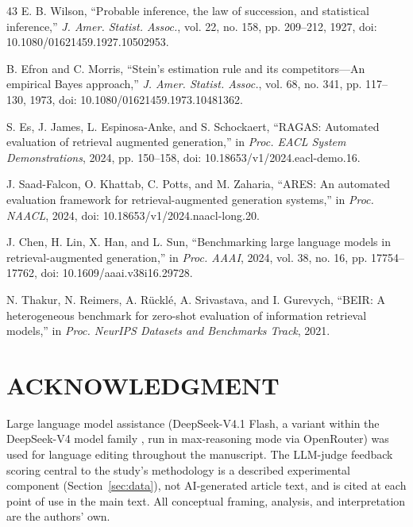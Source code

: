 \documentclass{ieeeaccess}
\begin{document}
\begin{thebibliography}{43}
 E. B. Wilson, ``Probable inference, the law of succession, and statistical inference,'' \emph{J. Amer. Statist. Assoc.}, vol. 22, no. 158, pp. 209--212, 1927, doi: 10.1080/01621459.1927.10502953.

 B. Efron and C. Morris, ``Stein's estimation rule and its competitors---An empirical Bayes approach,'' \emph{J. Amer. Statist. Assoc.}, vol. 68, no. 341, pp. 117--130, 1973, doi: 10.1080/01621459.1973.10481362.

 S. Es, J. James, L. Espinosa-Anke, and S. Schockaert, ``RAGAS: Automated evaluation of retrieval augmented generation,'' in \emph{Proc. EACL System Demonstrations}, 2024, pp. 150--158, doi: 10.18653/v1/2024.eacl-demo.16.

 J. Saad-Falcon, O. Khattab, C. Potts, and M. Zaharia, ``ARES: An automated evaluation framework for retrieval-augmented generation systems,'' in \emph{Proc. NAACL}, 2024, doi: 10.18653/v1/2024.naacl-long.20.

 J. Chen, H. Lin, X. Han, and L. Sun, ``Benchmarking large language models in retrieval-augmented generation,'' in \emph{Proc. AAAI}, 2024, vol. 38, no. 16, pp. 17754--17762, doi: 10.1609/aaai.v38i16.29728.

 N. Thakur, N. Reimers, A. R\"uckl\'e, A. Srivastava, and I. Gurevych, ``BEIR: A heterogeneous benchmark for zero-shot evaluation of information retrieval models,'' in \emph{Proc. NeurIPS Datasets and Benchmarks Track}, 2021.

\end{thebibliography}


\section*{ACKNOWLEDGMENT}
Large language model assistance (DeepSeek-V4.1 Flash, a variant within the
DeepSeek-V4 model family \cite{b33}, run in max-reasoning mode via OpenRouter) was
used for language editing throughout the manuscript. The LLM-judge feedback scoring
central to the study's methodology is a described experimental component
(Section~\ref{sec:data}), not AI-generated article text, and is cited at each point
of use in the main text. All conceptual framing, analysis, and interpretation are
the authors' own.

\newpage
\end{document}
